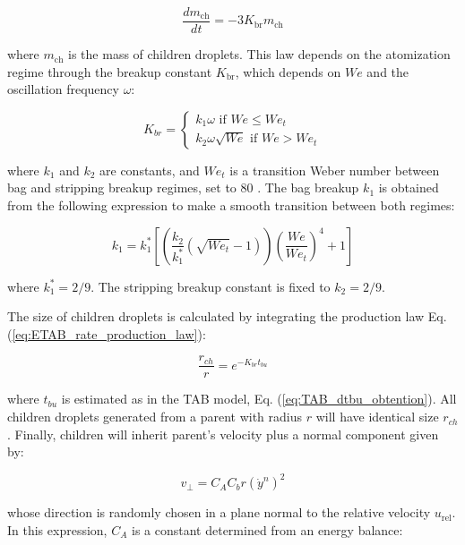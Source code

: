 \begin{equation}
\label{eq:ETAB_rate_production_law}
\frac{d m_\mathrm{ch}}{dt} = - 3 K_\mathrm{br} m_\mathrm{ch}
\end{equation}

where $m_\mathrm{ch}$ is the mass of children droplets. This law depends on the atomization regime through the breakup constant $K_\mathrm{br}$, which depends on $We$ and the oscillation frequency $\omega$:

\begin{equation}
\label{eq:ETAB_Kbr_equation}
K_{br} =
\left\{
    \begin{split}
    k_1 \omega \,\,\mathrm{if}\,\,We \leq We_t \\ 
    k_2 \omega \sqrt{We} \,\,\mathrm{if}\,\,We > We_t
    \end{split}
\right.
\end{equation}

where $k_1$ and $k_2$ are constants, and $We_t$ is a transition Weber number between bag and stripping breakup regimes, set to 80 . The bag breakup $k_1$ is obtained from the following expression to make a smooth transition between both regimes:

\begin{equation}
k_1 = k_1^* \left[\left(  \frac{k_2}{k_1^*} \left( \sqrt{We_t} - 1 \right) \right) \left( \frac{We}{We_t} \right)^4 + 1 \right]
\end{equation}

where $k_1^* = 2/9$. The stripping breakup constant is fixed to $k_2 = 2/9$.

The size of children droplets is calculated by integrating the production law Eq. (\ref{eq:ETAB_rate_production_law}):

\begin{equation}
\label{eq:ETAB_model_radius_ratio}
\frac{r_{ch}}{r} = e ^{-K_{br} t_{bu}}
\end{equation}

where $t_{bu}$ is estimated as in the TAB model, Eq. (\ref{eq:TAB_dtbu_obtention}). All children droplets generated from a parent with radius $r$ will have identical size $r_{ch}$. Finally, children will inherit parent's velocity plus a normal component given by:

\begin{equation}
v_\perp = C_A C_b r \left(\dot{y}^n\right)^2 
\end{equation}

whose direction is randomly chosen in a plane normal to the relative velocity $u_\mathrm{rel}$. In this expression, $C_A$ is a constant determined from an energy balance:

